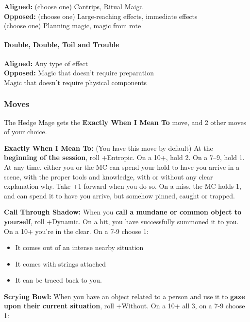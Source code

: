 \documentclass[
]{article}
\providecommand{\tightlist}{%
  \setlength{\itemsep}{0pt}\setlength{\parskip}{0pt}}
\begin{document}
\textbf{Aligned:} (choose one) Cantrips, Ritual Maigc\\
\textbf{Opposed:} (choose one) Large-reaching effects, immediate
effects\\
(choose one) Planning magic, magic from rote

\hypertarget{double-double-toil-and-trouble}{%
\paragraph{Double, Double, Toil and
Trouble}\label{double-double-toil-and-trouble}}

\textbf{Aligned:} Any type of effect\\
\textbf{Opposed:} Magic that doesn't require preparation\\
Magic that doesn't require physical components

\hypertarget{moves-2}{%
\subsubsection{Moves}\label{moves-2}}

The Hedge Mage gets the \textbf{Exactly When I Mean To} move, and 2
other moves of your choice.

\textbf{Exactly When I Mean To:} (You have this move by default) At the
\textbf{beginning of the session}, roll +Entropic. On a 10+, hold 2. On
a 7--9, hold 1. At any time, either you or the MC can spend your hold to
have you arrive in a scene, with the proper tools and knowledge, with or
without any clear explanation why. Take +1 forward when you do so. On a
miss, the MC holds 1, and can spend it to have you arrive, but somehow
pinned, caught or trapped.

\textbf{Call Through Shadow:} When you \textbf{call a mundane or common
object to yourself}, roll +Dynamic. On a hit, you have successfully
summoned it to you. On a 10+ you're in the clear. On a 7-9 choose 1:

\begin{itemize}
\tightlist
\item
  It comes out of an intense nearby situation
\item
  It comes with strings attached
\item
  It can be traced back to you.
\end{itemize}

\textbf{Scrying Bowl:} When you have an object related to a person and
use it to \textbf{gaze upon their current situation}, roll +Without. On
a 10+ all 3, on a 7-9 choose 1:
\end{document}
